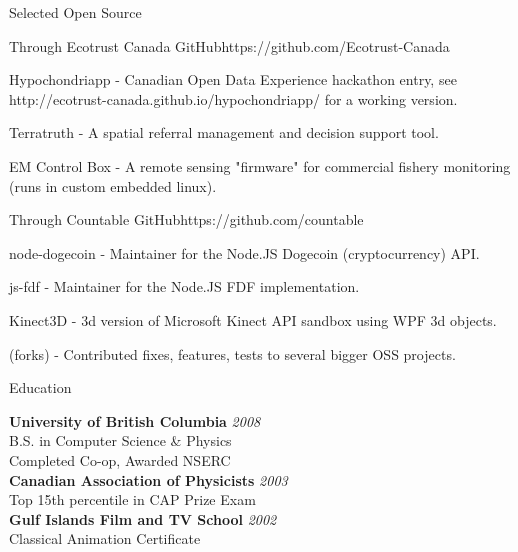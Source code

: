 \documentclass{resume} %
\begin{document}

\begin{rSection}{Selected Open Source}

\begin{rSubsection}{Through Ecotrust Canada GitHub}{https://github.com/Ecotrust-Canada}{}{}
\item Hypochondriapp - Canadian Open Data Experience hackathon entry, see \newline
http://ecotrust-canada.github.io/hypochondriapp/ for a working version.
\item Terratruth - A spatial referral management and decision support tool.
\item EM Control Box - A remote sensing "firmware" for commercial fishery monitoring (runs in custom embedded linux).
\end{rSubsection}

\begin{rSubsection}{Through Countable GitHub}{https://github.com/countable}{}{}
\item node-dogecoin - Maintainer for the Node.JS Dogecoin (cryptocurrency) API.
\item js-fdf - Maintainer for the Node.JS FDF implementation.
\item Kinect3D - 3d version of Microsoft Kinect API sandbox using WPF 3d objects.
\item (forks) - Contributed fixes, features, tests to several bigger OSS projects.
\end{rSubsection}


\end{rSection}




\begin{rSection}{Education}

{\bf University of British Columbia} \hfill {\em 2008} \\ 
B.S. in Computer Science \& Physics \\
Completed Co-op, Awarded NSERC \\

{\bf Canadian Association of Physicists} \hfill {\em 2003} \\ 
Top 15th percentile in CAP Prize Exam \\

{\bf Gulf Islands Film and TV School} \hfill {\em 2002} \\ 
Classical Animation Certificate \\

\end{rSection}
\end{document}
